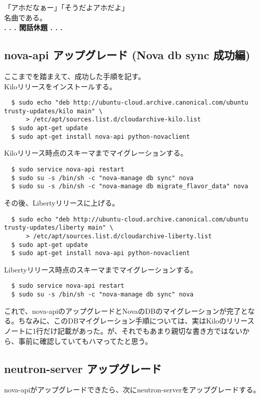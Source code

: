 \documentclass[9pt,b5paper,tombo,openany]{jsbook}
\begin{document}
\noindent
「アホだなぁー」「そうだよアホだよ」\\[1ex]

\noindent
名曲である。\\[1ex]

\noindent
\textbf{. . . 閑話休題 . . .}


\subsection{nova-api アップグレード (Nova db sync 成功編)}
\noindent
ここまでを踏まえて、成功した手順を記す。\\[1ex]

\noindent
Kiloリリースをインストールする。

\begin{lstlisting}
  $ sudo echo "deb http://ubuntu-cloud.archive.canonical.com/ubuntu trusty-updates/kilo main" \
      > /etc/apt/sources.list.d/cloudarchive-kilo.list
  $ sudo apt-get update
  $ sudo apt-get install nova-api python-novaclient
\end{lstlisting}

\noindent
Kiloリリース時点のスキーマまでマイグレーションする。
\begin{lstlisting}
  $ sudo service nova-api restart
  $ sudo su -s /bin/sh -c "nova-manage db sync" nova
  $ sudo su -s /bin/sh -c "nova-manage db migrate_flavor_data" nova
\end{lstlisting}

\noindent
その後、Libertyリリースに上げる。
\begin{lstlisting}
  $ sudo echo "deb http://ubuntu-cloud.archive.canonical.com/ubuntu trusty-updates/liberty main" \
      > /etc/apt/sources.list.d/cloudarchive-liberty.list
  $ sudo apt-get update
  $ sudo apt-get install nova-api python-novaclient
\end{lstlisting}

\noindent
Libertyリリース時点のスキーマまでマイグレーションする。
\begin{lstlisting}
  $ sudo service nova-api restart
  $ sudo su -s /bin/sh -c "nova-manage db sync" nova
\end{lstlisting}

これで、nova-apiのアップグレードとNovaのDBのマイグレーションが完了となる。ちなみに、このDBマイグレーション手順については、実はKiloのリリースノートに1行だけ記載があった。が、それでもあまり親切な書き方ではないから、事前に確認していてもハマってたと思う。

\subsection{neutron-server アップグレード}
\noindent
nova-apiがアップグレードできたら、次にneutron-serverをアップグレードする。\\[1ex]
\end{document}

